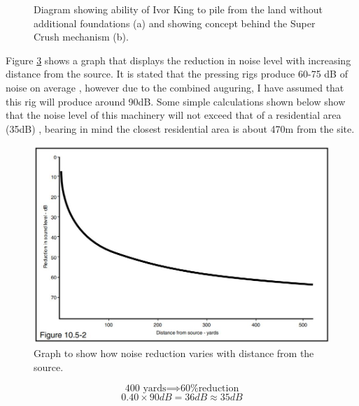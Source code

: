 \documentclass[12pt, a4paper]{article}
\begin{document}
\begin{justify}
\begin{figure}[H]
\begin{subfigure}[h]{.5\textwidth}
\begin{center}
\caption{}
  	\label{magSim2}
  \end{center}
  \end{subfigure}
  \caption{Diagram showing ability of Ivor King to pile from the land without additional foundations (a) and showing concept behind the Super Crush mechanism (b). \cite{l}  }
	\label{drills}
\end{figure}


Figure \ref{noise} shows a graph that displays the reduction in noise level with increasing distance from the source. It is stated that the pressing rigs produce 60-75 dB of noise on average \cite{m}, however due to the combined auguring, I have assumed that this rig will produce around 90dB. Some simple calculations shown below show that the noise level of this machinery will not exceed that of a residential area (35dB) \cite{m}, bearing in mind the closest residential area is about 470m from the site.
\end{justify}
\begin{figure}[H]
\centering
  	\includegraphics[width=0.5\textheight]{noise}
   	\caption{Graph to show how noise reduction varies with distance from the source.\cite{m}}
	\label{noise}
\end{figure}
\begin{equation}
    \text{400 yards}\implies \text{60\% reduction} 
\end{equation}
\begin{equation}
    0.40\times90dB=36dB\approx35dB
\end{equation}
\end{document}
